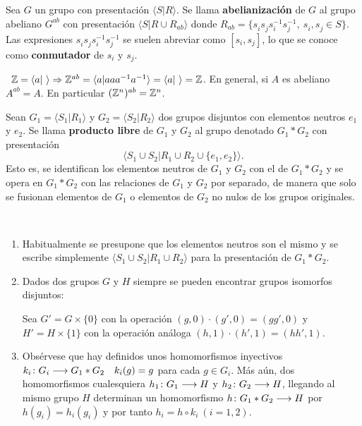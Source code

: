 \documentclass[GTSResumen.tex]{subfiles}
\begin{document}
\begin{defi}
Sea $G$ un grupo con presentación $\langle S|R\rangle$. Se llama \textbf{abelianización} de $G$ al grupo abeliano $G^{ab}$ con presentación $\langle S| R\cup R_{ab}\rangle$ donde $R_{ab}=\{s^{}_i s^{}_j s^{-1}_i s^{-1}_j,\ s^{}_i, s^{}_j\in S \}$. Las expresiones $s^{}_i s^{}_j s^{-1}_i s^{-1}_j$ se suelen abreviar como $[s_i,s_j]$, lo que se conoce como \textbf{conmutador} de $s_i$ y $s_j$.
\end{defi}

\begin{ej}\
$\mathbb{Z}=\langle a|\ \rangle\Rightarrow \mathbb{Z}^{ab}=\langle a| aaa^{-1}a^{-1}\rangle=\langle a|\ \rangle =\mathbb{Z}$. En general, si $A$ es abeliano $A^{ab}=A$. En particular $(\mathbb{Z}^n)^{ab}=\mathbb{Z}^n$.
\end{ej}

\vspace{1cm}

\begin{defi}
Sean $G_1=\langle S_1|R_1\rangle$ y $G_2=\langle S_2|R_2\rangle$ dos grupos disjuntos con elementos neutros $e_1$ y $e_2$. Se llama \textbf{producto libre} de $G_1$ y $G_2$ al grupo denotado $G_1*G_2$ con presentación
\[
\langle S_1\cup S_2|R_1\cup R_2\cup\{e_1,e_2\}\rangle.
\]
Esto es, se identifican los elementos neutros de $G_1$ y $G_2$ con el de $G_1*G_2$ y se opera en $G_1*G_2$ con las relaciones de $G_1$ y $G_2$ por separado, de manera que solo se fusionan elementos de $G_1$ o elementos de $G_2$ no nulos de los grupos originales.
\end{defi}

\begin{nota}\
\begin{enumerate}
\item Habitualmente se presupone que los elementos neutros son el mismo y se escribe simplemente $\langle S_1\cup S_2|R_1\cup R_2\rangle$ para la presentación de $G_1*G_2$.
\item Dados dos grupos $G$ y $H$ siempre se pueden encontrar grupos isomorfos disjuntos:

Sea $G'=G\times\{0\}$ con la operación $(g,0)\cdot(g',0)=(gg',0)$ y $H'=H\times\{1\}$ con la operación análoga $(h,1)\cdot(h',1)=(hh',1)$.
\item Obsérvese que hay definidos unos homomorfismos inyectivos $k_i\colon{G_i}\longrightarrow{G_1*G_2}\quad k_i(g)=g$ para cada $g\in G_i$. Más aún, dos homomorfismos cualesquiera $h_1\colon{G_1}\longrightarrow{H}$ y $h_2\colon{G_2}\longrightarrow{H}$, llegando al mismo grupo $H$ determinan un homomorfismo $h\colon{G_1*G_2}\longrightarrow{H}$ por $h(g_i)=h_i(g_i)$ y por tanto $h_i=h\circ k_i\ (i=1,2)$.
\end{enumerate}
\end{nota}
\end{document}
